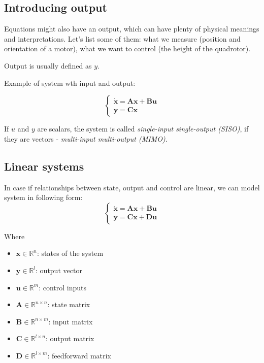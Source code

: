 \subsection{Introducing output}
Equations might also have an output, which can have plenty of physical meanings and interpretations. Let's list some of them:
what we measure (position and orientation of a motor), what we want to control (the height of the quadrotor).

Output is usually defined as $y$. 

Example of system wth input and output:

\begin{equation}
    \begin{cases}
    \mathbf{\dot{x}}=\mathbf{A}\mathbf{x} + \mathbf{B}\mathbf{u} \\
    \mathbf{y}=\mathbf{C}\mathbf{x}
    \end{cases}
\end{equation}

If $u$ and $y$ are scalars, the system is called \emph{single-input single-output (SISO)}, if they are vectors - \emph{multi-input multi-output (MIMO)}.

\subsection*{Linear systems}
In case if relationships between state, output and control are linear, we can model system in following form:
\begin{equation}
\begin{cases}
\mathbf{\dot{x}} =\mathbf{A}\mathbf{x} + \mathbf{B}\mathbf{u} \\
\mathbf{y}=\mathbf{C}\mathbf{x} + \mathbf{D}\mathbf{u}
\end{cases}
\end{equation}


Where
\begin{itemize}
    \item $\mathbf{x} \in \mathbb{R}^n$: states of the system
    \item $\mathbf{y} \in \mathbb{R}^l$: output vector
    \item $\mathbf{u} \in \mathbb{R}^m$: control inputs
    \item $\mathbf{A} \in \mathbb{R}^{n \times n}$: state matrix
    \item $\mathbf{B} \in \mathbb{R}^{n \times m}$: input matrix
    \item $\mathbf{C} \in \mathbb{R}^{l \times n}$: output matrix
    \item $\mathbf{D} \in \mathbb{R}^{l \times m}$: feedforward matrix
\end{itemize}


